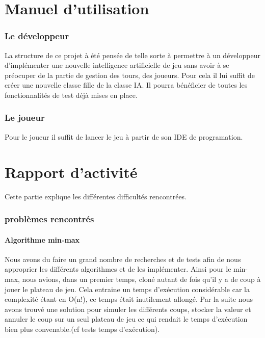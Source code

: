 \documentclass{report}
\begin{document}
\part{Manuel d'utilisation}
	\section{Le développeur}
	La structure de ce projet à été pensée de telle sorte à permettre à un développeur d'implémenter une nouvelle intelligence artificielle de jeu sans avoir à se préocuper de la partie de gestion des tours, des joueurs. Pour cela il lui suffit de créer une nouvelle classe fille de la classe IA. Il pourra bénéficier de toutes les fonctionnalités de test déjà mises en place.
	
	

	\section{Le joueur}
	Pour le joueur il suffit de lancer le jeu à partir de son IDE de programation. 

\part{Rapport d'activité}
Cette partie explique les différentes difficultés rencontrées.
\section{problèmes rencontrés}
\subsection{Algorithme min-max}
 Nous avons du faire un grand nombre de recherches et de tests afin de nous approprier les différents algorithmes et de les implémenter.
Ainsi pour le min-max, nous avions, dans un premier temps, cloné autant de fois qu'il y a de coup à jouer le plateau de jeu. Cela entraine un temps d'exécution considérable car la complexité étant en O(n!), ce temps était inutilement allongé. Par la suite nous avons trouvé une solution pour simuler les différents coups, stocker la valeur et annuler le coup sur un seul plateau de jeu ce qui rendait le temps d'exécution bien plus convenable.(cf tests temps d'exécution).
\end{document}
